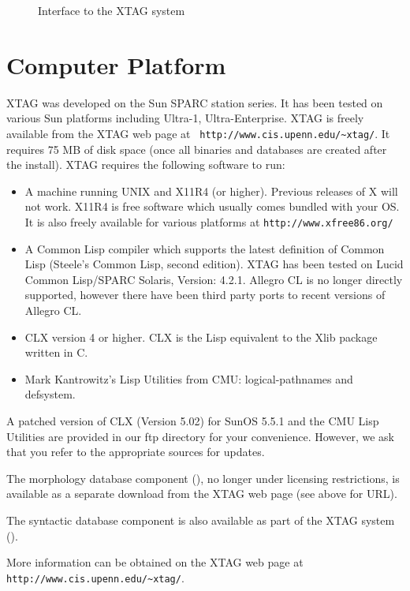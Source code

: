 \begin{figure}[htb]
\centering
\mbox{}
{}
\caption[XTAG Interface]{Interface to the XTAG system}
\label{xtag-interface}
\end{figure}

\section{Computer Platform}


XTAG was developed on the Sun SPARC station series. It has been tested
on various Sun platforms including Ultra-1, Ultra-Enterprise. XTAG is
freely available from the XTAG web page at {\tt
  http://www.cis.upenn.edu/\~{}xtag/}. It requires 75 MB of disk space
(once all binaries and databases are created after the install). XTAG
requires the following software to run:

\begin{itemize}
  
\item A machine running UNIX and X11R4 (or higher). Previous releases
  of X will not work. X11R4 is free software which usually comes
  bundled with your OS. It is also freely available for various
  platforms at {\tt http://www.xfree86.org/}
  
\item A Common Lisp compiler which supports the latest definition of
  Common Lisp (Steele's Common Lisp, second edition). XTAG has been
  tested on Lucid Common Lisp/SPARC Solaris, Version: 4.2.1. Allegro
  CL is no longer directly supported, however there have been third
  party ports to recent versions of Allegro CL.
  
\item CLX version 4 or higher. CLX is the Lisp equivalent to the Xlib
  package written in C.
  
\item Mark Kantrowitz's Lisp Utilities from CMU: logical-pathnames and
  defsystem.

\end{itemize}

A patched version of CLX (Version 5.02) for SunOS 5.5.1 and the CMU
Lisp Utilities are provided in our ftp directory for your convenience.
However, we ask that you refer to the appropriate sources for updates.

The morphology database component (\cite{karp92}), no longer under
licensing restrictions, is available as a separate download from the
XTAG web page (see above for URL).

The syntactic database component is also available as part of the XTAG
system (\cite{EgediMartin94}). 

More information can be obtained on the XTAG web page at \\
{\tt http://www.cis.upenn.edu/\~{}xtag/}.

